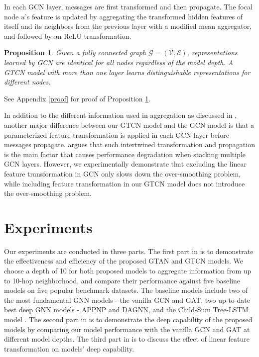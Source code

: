 \documentclass[lettersize,journal]{IEEEtran}
\theoremstyle{plain}
\newtheorem{proposition}[theorem]{Proposition}
\theoremstyle{definition}
\theoremstyle{remark}
\begin{document}
In each GCN layer, messages are first transformed and then propagate. The focal node $u$'s feature is updated by aggregating the transformed hidden features of itself and its neighbors from the previous layer with a modified mean aggregator, and followed by an ReLU transformation.

\begin{proposition}
	\label{prop:deep}
	Given a fully connected graph $\mathcal{G}=(\mathcal{V}, \mathcal{E})$, representations learned by GCN are identical for all nodes regardless of the model depth. A GTCN model with more than one layer learns distinguishable representations for different nodes.
\end{proposition}

See Appendix \ref{proof} for proof of Proposition \ref{prop:deep}.

In addition to the different information used in aggregation as discussed in , another major difference between our GTCN model and the GCN model is that a parameterized feature transformation is applied in each GCN layer before messages propagate. \cite{liu2020towards} argues that such intertwined transformation and propagation is the main factor that causes performance degradation when stacking multiple GCN layers. However, we experimentally demonstrate that excluding the linear feature transformation in GCN only slows down the over-smoothing problem, while including feature transformation in our GTCN model does not introduce the over-smoothing problem.

\section{Experiments}
\label{exp}

Our experiments are conducted in three parts. The first part in  is to demonstrate the effectiveness and efficiency of the proposed GTAN and GTCN models. We choose a depth of 10 for both proposed models to aggregate information from up to 10-hop neighborhood, and compare their performance against five baseline models on five popular benchmark datasets. The baseline models include two of the most fundamental GNN models - the vanilla GCN and GAT, two up-to-date best deep GNN models - APPNP and DAGNN, and the Child-Sum Tree-LSTM model \cite{tai2015improved}. The second part in  is to demonstrate the deep capability of the proposed models by comparing our model performance with the vanilla GCN and GAT at different model depths. The third part in  is to discuss the effect of linear feature transformation on models' deep capability.
\end{document}
